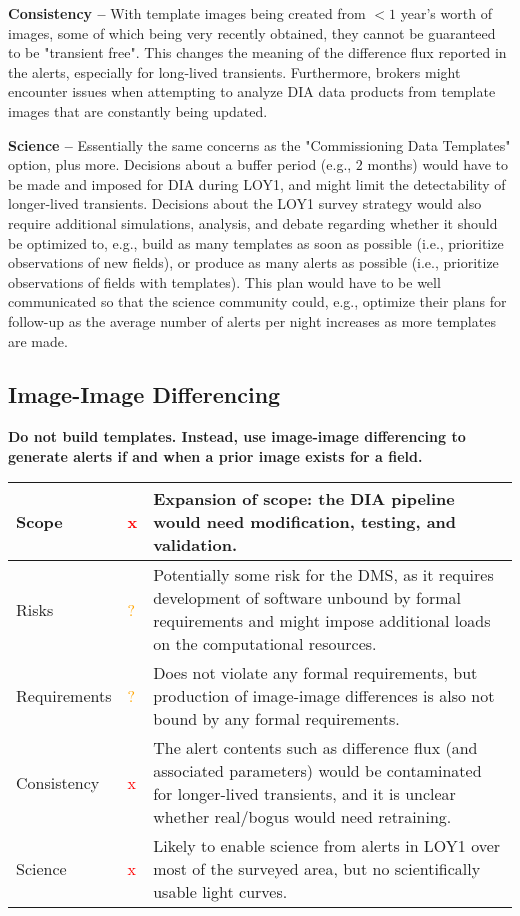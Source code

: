 \documentclass[DM,lsstdraft,toc]{lsstdoc}
\begin{document}
{\bf Consistency --} With template images being created from $<1$ year's worth of images, some of which being very recently obtained, they cannot be guaranteed to be "transient free". This changes the meaning of the difference flux reported in the alerts, especially for long-lived transients. Furthermore, brokers might encounter issues when attempting to analyze DIA data products from template images that are constantly being updated. 

{\bf Science --} Essentially the same concerns as the "Commissioning Data Templates" option, plus more. Decisions about a buffer period (e.g., $2$ months) would have to be made and imposed for DIA during LOY1, and might limit the detectability of longer-lived transients. Decisions about the LOY1 survey strategy would also require additional simulations, analysis, and debate regarding whether it should be optimized to, e.g., build as many templates as soon as possible (i.e., prioritize observations of new fields), or produce as many alerts as possible (i.e., prioritize observations of fields with templates). This plan would have to be well communicated so that the science community could, e.g., optimize their plans for follow-up as the average number of alerts per night increases as more templates are made.


\subsection{Image-Image Differencing}

{\bf Do not build templates. Instead, use image-image differencing to generate alerts if and when a prior image exists for a field.}

\begin{center}
\begin{tabular}{|p{2.5cm}|p{0.3cm}|p{13cm}|}
\hline
Scope & \textcolor{red}{x} & Expansion of scope: the DIA pipeline would need modification, testing, and validation. \\
\hline
Risks & \textcolor{orange}{?} & Potentially some risk for the DMS, as it requires development of software unbound by formal requirements and might impose additional loads on the computational resources. \\
\hline
Requirements & \textcolor{orange}{?} & Does not violate any formal requirements, but production of image-image differences is also not bound by any formal requirements. \\
\hline
Consistency & \textcolor{red}{x} & The alert contents such as difference flux (and associated parameters) would be contaminated for longer-lived transients, and it is unclear whether real/bogus would need retraining. \\
\hline
Science & \textcolor{red}{x} & Likely to enable science from alerts in LOY1 over most of the surveyed area, but no scientifically usable light curves. \\
\hline
\end{tabular}
\end{center}
\end{document}
